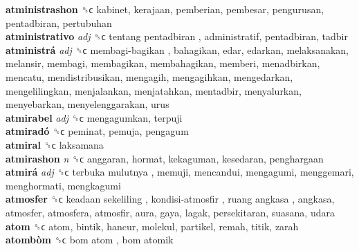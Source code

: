 \textbf{atministrashon} ␝ϲ  kabinet, kerajaan, pemberian, pembesar, pengurusan, pentadbiran, pertubuhan  \\
\textbf{atministrativo} \emph{adj}  ␝ϲ   tentang pentadbiran , administratif, pentadbiran, tadbir  \\
\textbf{atministrá} \emph{adj}  ␝ϲ   membagi-bagikan , bahagikan, edar, edarkan, melaksanakan, melansir, membagi, membagikan, membahagikan, memberi, menadbirkan, mencatu, mendistribusikan, mengagih, mengagihkan, mengedarkan, mengelilingkan, menjalankan, menjatahkan, mentadbir, menyalurkan, menyebarkan, menyelenggarakan, urus  \\
\textbf{atmirabel} \emph{adj}  ␝ϲ  mengagumkan, terpuji  \\
\textbf{atmiradó} ␝ϲ  peminat, pemuja, pengagum  \\
\textbf{atmiral} ␝ϲ  laksamana  \\
\textbf{atmirashon} \emph{n}  ␝ϲ  anggaran, hormat, kekaguman, kesedaran, penghargaan  \\
\textbf{atmirá} \emph{adj}  ␝ϲ   terbuka mulutnya , memuji, mencandui, mengagumi, menggemari, menghormati, mengkagumi  \\
\textbf{atmosfer} ␝ϲ   keadaan sekeliling ,  kondisi-atmosfir ,  ruang angkasa , angkasa, atmosfer, atmosfera, atmosfir, aura, gaya, lagak, persekitaran, suasana, udara  \\
\textbf{atom} ␝ϲ  atom, bintik, hancur, molekul, partikel, remah, titik, zarah  \\
\textbf{atombòm} ␝ϲ   bom atom ,  bom atomik   \\
